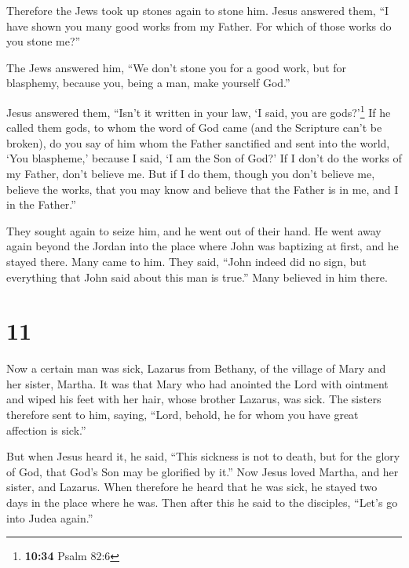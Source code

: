  Therefore the Jews took up stones again to stone him.
 Jesus answered them, ``I have shown you many good works
from my Father. For which of those works do you stone me?''

 The Jews answered him, ``We don't stone you for a good
work, but for blasphemy, because you, being a man, make yourself God.''

 Jesus answered them, ``Isn't it written in your law, `I
said, you are gods?'\footnote{\textbf{10:34} Psalm 82:6} 
If he called them gods, to whom the word of God came (and the Scripture
can't be broken),  do you say of him whom the Father
sanctified and sent into the world, `You blaspheme,' because I said, `I
am the Son of God?'  If I don't do the works of my
Father, don't believe me.  But if I do them, though you
don't believe me, believe the works, that you may know and believe that
the Father is in me, and I in the Father.''

 They sought again to seize him, and he went out of their
hand.  He went away again beyond the Jordan into the
place where John was baptizing at first, and he stayed there.
 Many came to him. They said, ``John indeed did no sign,
but everything that John said about this man is true.'' 
Many believed in him there.

\hypertarget{section-10}{%
\section{11}\label{section-10}}

 Now a certain man was sick, Lazarus from Bethany, of the
village of Mary and her sister, Martha.  It was that Mary
who had anointed the Lord with ointment and wiped his feet with her
hair, whose brother Lazarus, was sick.  The sisters
therefore sent to him, saying, ``Lord, behold, he for whom you have
great affection is sick.''

 But when Jesus heard it, he said, ``This sickness is not
to death, but for the glory of God, that God's Son may be glorified by
it.''  Now Jesus loved Martha, and her sister, and
Lazarus.  When therefore he heard that he was sick, he
stayed two days in the place where he was.  Then after
this he said to the disciples, ``Let's go into Judea again.''

